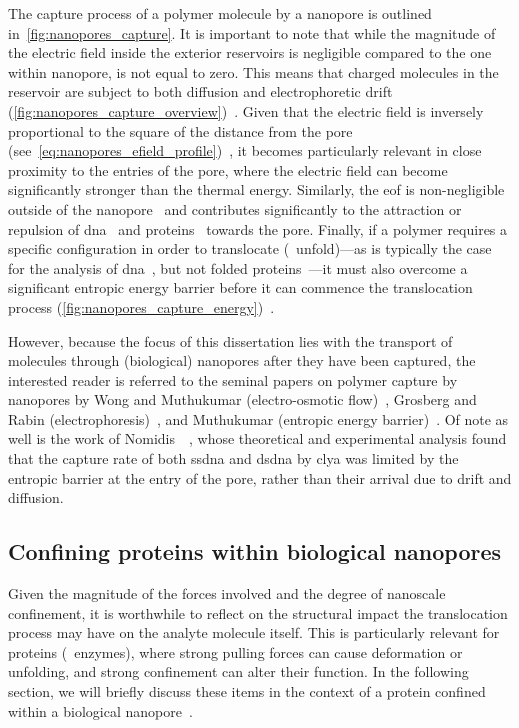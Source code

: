 The capture process of a polymer molecule by a nanopore is outlined in~\cref{fig:nanopores_capture}. It is
important to note that while the magnitude of the electric field inside the exterior reservoirs is negligible
compared to the one within nanopore, is not equal to zero. This means that charged molecules in the reservoir
are subject to both diffusion and electrophoretic drift
(\cref{fig:nanopores_capture_overview})~\cite{Muthukumar-2010}. Given that the electric field is inversely
proportional to the square of the distance from the pore
(see~\cref{eq:nanopores_efield_profile})~\cite{Grosberg-2010}, it becomes particularly relevant in close
proximity to the entries of the pore, where the electric field can become significantly stronger than the
thermal energy. Similarly, the \gls{eof} is non-negligible outside of the nanopore~\cite{Wong-2007} and
contributes significantly to the attraction or repulsion of \gls{dna}~\cite{Firnkes-2010} and
proteins~\cite{Soskine-2012,Soskine-2013} towards the pore. Finally, if a polymer requires a specific
configuration in order to translocate (\ie~unfold)---as is typically the case for the analysis of
\gls{dna}~\cite{Muthukumar-2010}, but not folded proteins~\cite{Yusko-2011,Soskine-2012,Plesa-2013}---it must
also overcome a significant entropic energy barrier before it can commence the translocation process
(\cref{fig:nanopores_capture_energy})~\cite{Muthukumar-2010}.

However, because the focus of this dissertation lies with the transport of molecules through (biological)
nanopores after they have been captured, the interested reader is referred to the seminal papers on polymer
capture by nanopores by Wong and Muthukumar (electro-osmotic flow)~\cite{Wong-2007}, Grosberg and Rabin
(electrophoresis)~\cite{Grosberg-2010}, and Muthukumar (entropic energy barrier)~\cite{Muthukumar-2010}. Of
note as well is the work of Nomidis~\etal~\cite{Nomidis-2018}, whose theoretical and experimental analysis
found that the capture rate of both \gls{ssdna} and \gls{dsdna} by \gls{clya} was limited by the entropic
barrier at the entry of the pore, rather than their arrival due to drift and diffusion.


\subsection{Confining proteins within biological nanopores}
%
\label{sec:np:confinement}
%

Given the magnitude of the forces involved and the degree of nanoscale confinement, it is worthwhile to
reflect on the structural impact the translocation process may have on the analyte molecule itself. This is
particularly relevant for proteins (\eg~enzymes), where strong pulling forces can cause deformation or
unfolding, and strong confinement can alter their function. In the following section, we will briefly discuss
these items in the context of a protein confined within a biological nanopore~\cite{Galenkamp-2020}.


